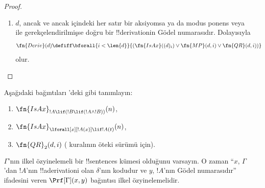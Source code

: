 \begin{proof}
\begin{enumerate}
  \QR{} kuralının öteki sürümünü alıştırma olarak bırakıyoruz.
\item $d$, ancak ve ancak içindeki her satır bir aksiyomsa ya da modus ponens
  veya \QR{} ile gerekçelendirilmişse doğru bir !!{derivation}{}in Gödel
  numarasıdır. Dolayısıyla
  \[
  \fn{Deriv}(d) \defiff \bforall{i < \len{d}}{(\fn{IsAx}((d)_i) \lor
    \fn{MP}(d,i) \lor \fn{QR}(d, i))}
  \]
  olur.
\end{enumerate}
\end{proof}

\begin{prob}
Aşağıdaki bağıntıları 'deki gibi
tanımlayın:
\begin{enumerate}
\item $\fn{IsAx}_{!A \lif (!B \lif (!A \land !B))}(n)$,
\item $\fn{IsAx}_{\lforall[x][!A(x)] \lif !A(t)}(n)$,
\item $\fn{QR}_{2}(d, i)$ (\QR{} kuralının öteki sürümü için).
\end{enumerate}
\end{prob}

\begin{prop}
$\Gamma$'nın ilkel özyinelemeli bir !!{sentence}s kümesi olduğunu varsayın.
O zaman ``$x$, $\Gamma$'dan $!A$'nın !!a{derivation}{}i olan $\delta$'nın kodudur
ve $y$, $!A$'nın Gödel numarasıdır'' ifadesini veren
$\Prf[\Gamma](x, y)$ bağıntısı ilkel özyinelemelidir.
\end{prop}

